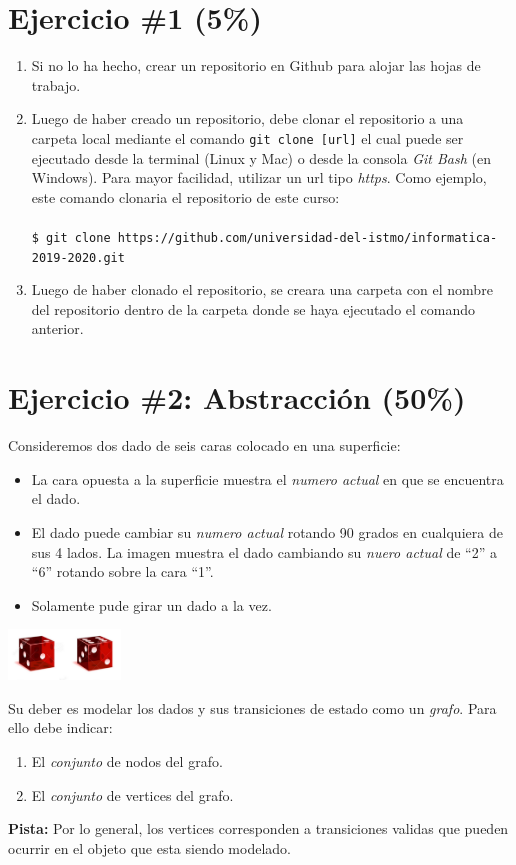 \documentclass{article}
\begin{document}
\section*{Ejercicio \#1 (5\%)}
\begin{enumerate}
        \item{
                Si no lo ha hecho, crear un repositorio en Github para alojar
                las hojas de trabajo.}
        \item{
                Luego de haber creado un repositorio, debe clonar el repositorio
                a una carpeta local mediante el comando \texttt{git clone [url]} el cual
                puede ser ejecutado desde la terminal (Linux y Mac) o desde la consola
                \emph{Git Bash} (en Windows). Para mayor
                facilidad, utilizar un url tipo \emph{https}.
                Como ejemplo, este comando clonaria el repositorio de este curso: \\\\
                \texttt{\$ git clone https://github.com/universidad-del-istmo/informatica-2019-2020.git}
        }
        \item{
                Luego de haber clonado el repositorio, se creara una carpeta
                con el nombre del repositorio dentro de la carpeta donde se
                haya ejecutado el comando anterior.
        }
\end{enumerate}

\section*{Ejercicio \#2: Abstracci\'on (50\%)}
Consideremos dos dado de seis caras colocado en una superficie:
\begin{itemize}
        \item{La cara opuesta a la superficie muestra el \emph{numero actual} en que se encuentra el dado.}
        \item{El dado puede cambiar su \emph{numero actual} rotando 90 grados en cualquiera de
        sus 4 lados. La imagen muestra el dado cambiando su \emph{nuero actual} de ``2'' a ``6''
        rotando sobre la cara ``1''.}
        \item{Solamente pude girar un dado a la vez.}
\end{itemize}
\begin{center}
\includegraphics[width=3cm]{die.png}
\end{center}
Su deber es modelar los dados y sus transiciones de estado como un \emph{grafo}. Para ello debe
indicar:
\begin{enumerate}
        \item{El \emph{conjunto} de nodos del grafo.}
        \item{El \emph{conjunto} de vertices del grafo.}
\end{enumerate}
{\bf Pista:} Por lo general, los vertices corresponden a transiciones validas que pueden
ocurrir en el objeto que esta siendo modelado.
\end{document}
